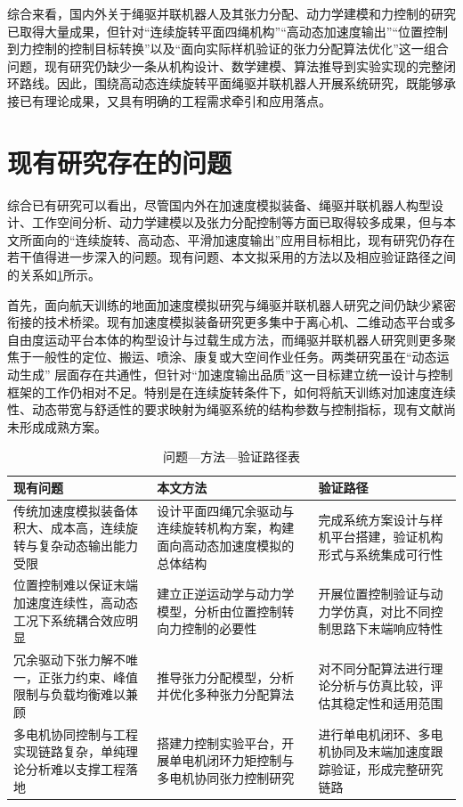 综合来看，国内外关于绳驱并联机器人及其张力分配、动力学建模和力控制的研究已取得大量成果，但针对“连续旋转平面四绳机构”“高动态加速度输出”“位置控制到力控制的控制目标转换”以及“面向实际样机验证的张力分配算法优化”这一组合问题，现有研究仍缺少一条从机构设计、数学建模、算法推导到实验实现的完整闭环路线。因此，围绕高动态连续旋转平面绳驱并联机器人开展系统研究，既能够承接已有理论成果，又具有明确的工程需求牵引和应用落点。

\section{现有研究存在的问题}

综合已有研究可以看出，尽管国内外在加速度模拟装备、绳驱并联机器人构型设计、工作空间分析、动力学建模以及张力分配控制等方面已取得较多成果，但与本文所面向的“连续旋转、高动态、平滑加速度输出”应用目标相比，现有研究仍存在若干值得进一步深入的问题。现有问题、本文拟采用的方法以及相应验证路径之间的关系如\cref{fig:intro-problem-path}所示。


首先，面向航天训练的地面加速度模拟研究与绳驱并联机器人研究之间仍缺少紧密衔接的技术桥梁。现有加速度模拟装备研究更多集中于离心机、二维动态平台或多自由度运动平台本体的构型设计与过载生成方法，而绳驱并联机器人研究则更多聚焦于一般性的定位、搬运、喷涂、康复或大空间作业任务。两类研究虽在“动态运动生成” 层面存在共通性，但针对“加速度输出品质”这一目标建立统一设计与控制框架的工作仍相对不足\cite{liu2024centrifuge,zhang2020groundsimulation,qian2018review,wang2025review}。特别是在连续旋转条件下，如何将航天训练对加速度连续性、动态带宽与舒适性的要求映射为绳驱系统的结构参数与控制指标，现有文献尚未形成成熟方案。

\begin{table}[H]
  \centering
  \wuhao
  \caption{问题—方法—验证路径表}
  \label{fig:intro-problem-path}
  \renewcommand{\arraystretch}{1.35}
  \setlength{\tabcolsep}{5pt}
  \begin{tabularx}{\textwidth}{>{\centering\arraybackslash}p{}>{\centering\arraybackslash}p{}>{\centering\arraybackslash}X}
    \toprule
    现有问题 & 本文方法 & 验证路径 \\
    \midrule
    传统加速度模拟装备体积大、成本高，连续旋转与复杂动态输出能力受限 &
    设计平面四绳冗余驱动与连续旋转机构方案，构建面向高动态加速度模拟的总体结构 &
    完成系统方案设计与样机平台搭建，验证机构形式与系统集成可行性 \\
    \midrule
    位置控制难以保证末端加速度连续性，高动态工况下系统耦合效应明显 &
    建立正逆运动学与动力学模型，分析由位置控制转向力控制的必要性 &
    开展位置控制验证与动力学仿真，对比不同控制思路下末端响应特性 \\
    \midrule
    冗余驱动下张力解不唯一，正张力约束、峰值限制与负载均衡难以兼顾 &
    推导张力分配模型，分析并优化多种张力分配算法 &
    对不同分配算法进行理论分析与仿真比较，评估其稳定性和适用范围 \\
    \midrule
    多电机协同控制与工程实现链路复杂，单纯理论分析难以支撑工程落地 &
    搭建力控制实验平台，开展单电机闭环力矩控制与多电机协同张力控制研究 &
    进行单电机闭环、多电机协同及末端加速度跟踪验证，形成完整研究链路 \\
    \bottomrule
  \end{tabularx}
\end{table}


